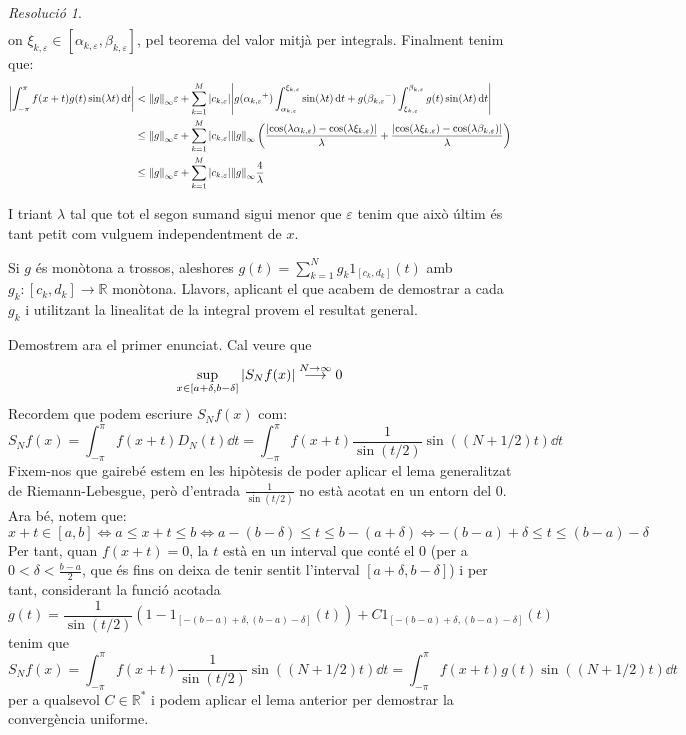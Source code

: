 \documentclass[10pt,a4paper]{article}
\newcommand{\RR}{\ensuremath{\mathbb{R}}} %
\newcommand{\vf}[1]{\boldsymbol{\mathrm{#1}}} %
\theoremstyle{definition}
\theoremstyle{remark}
\newtheorem*{res}{Resolució}
\begin{document}
\begin{res}
\begin{align*}
  \end{align*}
  on $\xi_{k,\varepsilon}\in[{\alpha_{k,\varepsilon}},{\beta_{k,\varepsilon}}]$, pel teorema del valor mitjà per integrals. Finalment tenim que:
  \begin{align*}
    \abs{\int_{-\pi}^{\pi}f(x+t)g(t)\sin(\lambda t)\dd{t}} & < \norm{g}_\infty\varepsilon+\sum_{k=1}^M\abs{c_{k,\varepsilon}}\abs{g({\alpha_{k,\varepsilon}}^+)\int_{\alpha_{k,\varepsilon}}^{\xi_{k,\varepsilon}}\sin(\lambda t)\dd{t}+g({\beta_{k,\varepsilon}}^-)\int_{\xi_{k,\varepsilon}}^{\beta_{k,\varepsilon}}g(t)\sin(\lambda t)\dd{t}}    \\
                                                           & \leq \norm{g}_\infty\varepsilon+\sum_{k=1}^M\abs{c_{k,\varepsilon}}\norm{g}_\infty\left(\frac{\abs{\cos(\lambda \alpha_{k,\varepsilon})-\cos(\lambda\xi_{k,\varepsilon})}}{\lambda}+\frac{\abs{\cos(\lambda \xi_{k,\varepsilon})-\cos(\lambda \beta_{k,\varepsilon})}}{\lambda}\right) \\
                                                           & \leq \norm{g}_\infty\varepsilon+\sum_{k=1}^M\abs{c_{k,\varepsilon}}\norm{g}_\infty\frac{4}{\lambda}
  \end{align*}

  I triant $\lambda$ tal que tot el segon sumand sigui menor que $\varepsilon$ tenim que això últim és tant petit com vulguem independentment de $x$.

  Si $g$ és monòtona a trossos, aleshores $g(t)=\sum_{k=1}^Ng_k\vf{1}_{[c_k,d_k]}(t)$ amb $g_k:[c_k,d_k]\rightarrow\RR$ monòtona. Llavors, aplicant el que acabem de demostrar a cada $g_k$ i utilitzant la linealitat de la integral provem el resultat general.

  Demostrem ara el primer enunciat. Cal veure que $$\sup_{x\in[a+\delta,b-\delta]}\abs{S_Nf(x)}\overset{N\to\infty}{\longrightarrow}0$$
  Recordem que podem escriure $S_Nf(x)$ com:
  $$S_Nf(x)=\int_{-\pi}^\pi f(x+t)D_N(t)\dd{t}=\int_{-\pi}^\pi f(x+t)\frac{1}{\sin(t/2)}\sin((N+1/2)t)\dd{t}$$
  Fixem-nos que gairebé estem en les hipòtesis de poder aplicar el lema generalitzat de Riemann-Lebesgue, però d'entrada $\frac{1}{\sin(t/2)}$ no està acotat en un entorn del 0. Ara bé, notem que:
  $$x+t\in [a,b]\iff a\leq x+t\leq b\iff a-(b-\delta)\leq t\leq b-(a+\delta)\iff -(b-a)+\delta\leq t\leq(b-a)-\delta$$
  Per tant, quan $f(x+t)=0$, la $t$ està en un interval que conté el 0 (per a $0<\delta<\frac{b-a}{2}$, que és fins on deixa de tenir sentit l'interval $[a+\delta,b-\delta]$) i per tant, considerant la funció acotada $$g(t)=\frac{1}{\sin(t/2)}(1-\vf{1}_{[-(b-a)+\delta,(b-a)-\delta]}(t))+C\vf{1}_{[-(b-a)+\delta,(b-a)-\delta]}(t)$$
  tenim que
  $$S_Nf(x)=\int_{-\pi}^\pi f(x+t)\frac{1}{\sin(t/2)}\sin((N+1/2)t)\dd{t}=\int_{-\pi}^\pi f(x+t)g(t)\sin((N+1/2)t)\dd{t}$$
  per a qualsevol $C\in\RR^*$ i podem aplicar el lema anterior per demostrar la convergència uniforme.
\end{res}
\end{document}

